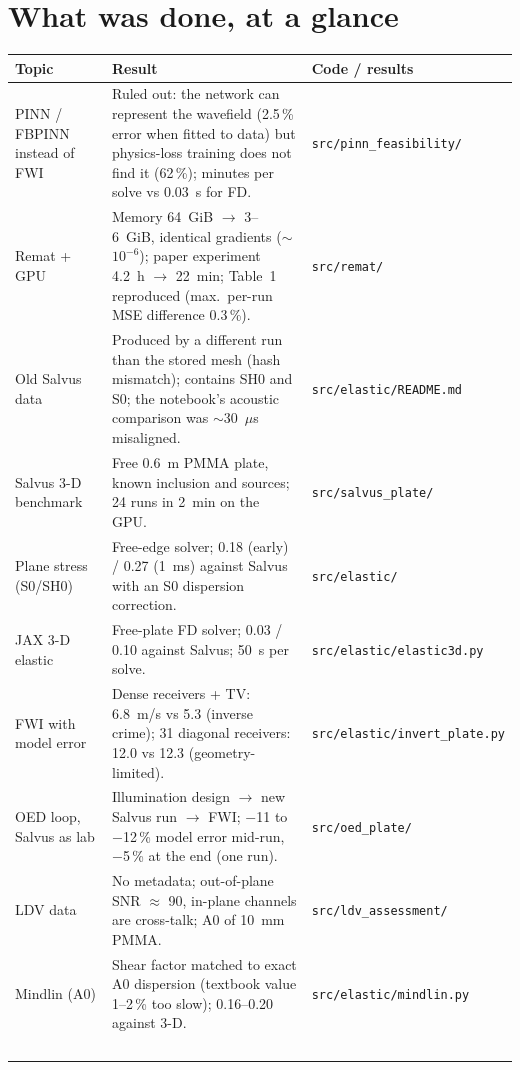 \documentclass[11pt,a4paper]{article}
\newcommand{\code}[1]{\texttt{\footnotesize #1}}
\begin{document}
\setcounter{tocdepth}{1}
\tableofcontents
\clearpage

\section{What was done, at a glance}
\begin{table}[h]
\centering\small
\begin{tabularx}{\textwidth}{@{}>{\raggedright\arraybackslash}p{2.9cm}L>{\raggedright\arraybackslash}p{3.9cm}@{}}
\toprule
Topic & Result & Code / results \\
\midrule
PINN / FBPINN instead of FWI & Ruled out: the network can represent the wavefield (2.5\,\% error when fitted to data) but physics-loss training does not find it (62\,\%); minutes per solve vs 0.03~s for FD. & \code{src/pinn\_feasibility/} \\
Remat + GPU & Memory 64~GiB $\to$ 3--6~GiB, identical gradients ($\sim$$10^{-6}$); paper experiment 4.2~h $\to$ 22~min; Table~1 reproduced (max.\ per-run MSE difference 0.3\,\%). & \code{src/remat/} \\
Old Salvus data & Produced by a different run than the stored mesh (hash mismatch); contains SH0 and S0; the notebook's acoustic comparison was $\sim$30~$\mu$s misaligned. & \code{src/elastic/README.md} \\
Salvus 3-D benchmark & Free 0.6~m PMMA plate, known inclusion and sources; 24 runs in 2~min on the GPU. & \code{src/salvus\_plate/} \\
Plane stress (S0/SH0) & Free-edge solver; 0.18 (early) / 0.27 (1~ms) against Salvus with an S0 dispersion correction. & \code{src/elastic/} \\
JAX 3-D elastic & Free-plate FD solver; 0.03 / 0.10 against Salvus; 50~s per solve. & \code{src/elastic/elastic3d.py} \\
FWI with model error & Dense receivers + TV: 6.8~m/s vs 5.3 (inverse crime); 31 diagonal receivers: 12.0 vs 12.3 (geometry-limited). & \code{src/elastic/invert\_plate.py} \\
OED loop, Salvus as lab & Illumination design $\to$ new Salvus run $\to$ FWI; $-$11 to $-$12\,\% model error mid-run, $-$5\,\% at the end (one run). & \code{src/oed\_plate/} \\
LDV data & No metadata; out-of-plane SNR $\approx$ 90, in-plane channels are cross-talk; A0 of 10~mm PMMA. & \code{src/ldv\_assessment/} \\
Mindlin (A0) & Shear factor matched to exact A0 dispersion (textbook value 1--2\,\% too slow); 0.16--0.20 against 3-D. & \code{src/elastic/mindlin.py} \\
$$
\end{tabularx}
\end{table}
\end{document}
